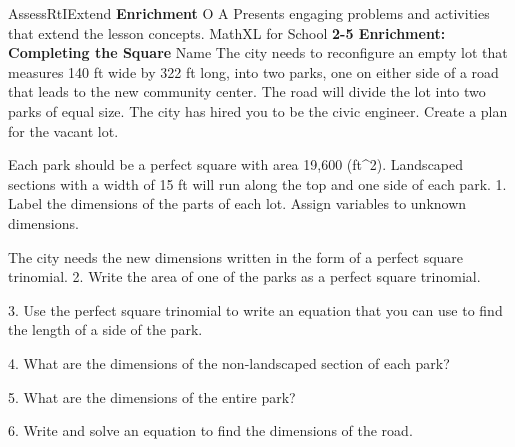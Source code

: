 \documentclass{article}
\newenvironment{te-addendum}[2]{}{}     %
\newcommand{\answer}[1]{}               %
\newcommand{\placeholder}[2]{}          %
\begin{document}
\begin{te-addendum}{Assess}{RtIExtend}
\textbf{Enrichment} O A
Presents engaging problems and activities that extend the lesson concepts.
MathXL for School
\textbf{2-5 Enrichment: Completing the Square}
Name \underline{\hspace{4em}}
The city needs to reconfigure an empty lot that measures 140 ft wide by 322 ft long, into two parks, one on either side of a road that leads to the new community center. The road will divide the lot into two parks of equal size.
The city has hired you to be the civic engineer.
Create a plan for the vacant lot.
\placeholder{diagram}{Horizontal empty rectangle, left vertical dimension 140 ft, bottom horizontal dimension 322 ft.}
Each park should be a perfect square with area 19,600 (ft^2). Landscaped sections with a width of 15 ft will run along the top and one side of each park.
1. Label the dimensions of the parts of each lot. Assign variables to unknown dimensions.
\placeholder{diagram}{Answer plan: two square parks separated by a narrow vertical rectangular road. Each park has an L-shaped border along top and side nearest road. Pink dimension labels 15 feet on top-border width and side-border width, x feet on the unlandscaped square's two sides; road bottom width y feet.}
\answer{Each landscaped strip is 15 ft wide; non-landscaped sides x ft; road width y ft.}
The city needs the new dimensions written in the form of a perfect square trinomial.
2. Write the area of one of the parks as a perfect square trinomial.
\answer{(x^2+30x+225)}
3. Use the perfect square trinomial to write an equation that you can use to find the length of a side of the park.
\answer{(x^2+30x+225=19,600)}
4. What are the dimensions of the non-landscaped section of each park?
\answer{125 ft by 125 ft}
5. What are the dimensions of the entire park?
\answer{140 ft by 140 ft}
6. Write and solve an equation to find the dimensions of the road.
\answer{(y+2(140)=322); (y=42); 42 ft wide by 140 ft long}
\end{te-addendum}
\end{document}
